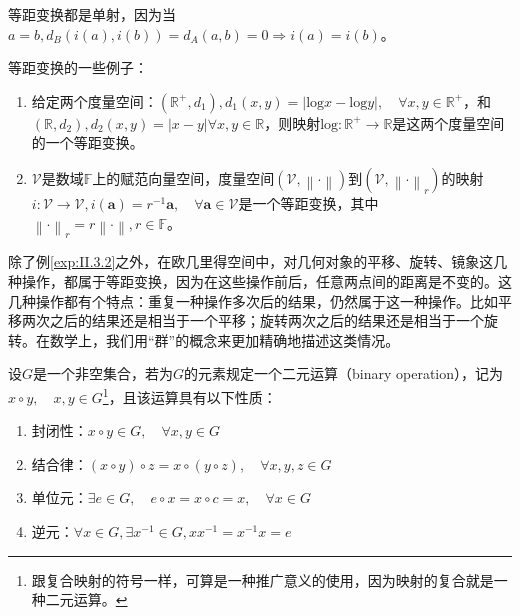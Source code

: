 \documentclass[main.tex]{subfiles}
\begin{document}
等距变换都是单射，因为当$a=b,d_B\left(i\left(a\right),i\left(b\right)\right)=d_A\left(a,b\right)=0\Rightarrow i\left(a\right)=i\left(b\right)$。

\begin{example}\label{exp:II.3.2}
    等距变换的一些例子：
    \begin{enumerate}
        \item 给定两个度量空间：$\left(\mathbb{R}^+,d_1\right),d_1\left(x,y\right)=\left|\mathrm{log}x-\mathrm{log}y\right|,\quad\forall x,y\in\mathbb{R}^+$，和$\left(\mathbb{R},d_2\right),d_2\left(x,y\right)=\left|x-y\right|\forall x,y\in\mathbb{R}$，则映射$\mathrm{log}:\mathbb{R}^+\rightarrow\mathbb{R}$是这两个度量空间的一个等距变换。
        \item $\mathcal{V}$是数域$\mathbb{F}$上的赋范向量空间，度量空间$\left(\mathcal{V},\left\|\cdot\right\|\right)$到$\left(\mathcal{V},\left\|\cdot\right\|_r\right)$的映射$i:\mathcal{V}\rightarrow\mathcal{V},i\left(\mathbf{a}\right)=r^{-1}\mathbf{a},\quad\forall\mathbf{a}\in\mathcal{V}$是一个等距变换，其中$\left\|\cdot\right\|_r=r\left\|\cdot\right\|,r\in\mathbb{F}$。
    \end{enumerate}
\end{example}

除了例\ref{exp:II.3.2}之外，在欧几里得空间中，对几何对象的平移、旋转、镜象这几种操作，都属于等距变换，因为在这些操作前后，任意两点间的距离是不变的。这几种操作都有个特点：重复一种操作多次后的结果，仍然属于这一种操作。比如平移两次之后的结果还是相当于一个平移；旋转两次之后的结果还是相当于一个旋转。在数学上，我们用“群”的概念来更加精确地描述这类情况。

\begin{definition}[群]\label{def:II.3.3}
    设$G$是一个非空集合，若为$G$的元素规定一个二元运算（binary operation），记为$x\circ y,\quad x,y\in G$\footnote{跟复合映射的符号一样，可算是一种推广意义的使用，因为映射的复合就是一种二元运算。}，且该运算具有以下性质：
    \begin{enumerate}
        \item 封闭性：$x\circ y\in G,\quad\forall x,y\in G$
        \item 结合律：$\left(x\circ y\right)\circ z=x\circ\left(y\circ z\right),\quad\forall x,y,z\in G$
        \item 单位元：$\exists e\in G,\quad e\circ x=x\circ c=x,\quad\forall x\in G$
        \item 逆元：$\forall x\in G,\exists x^{-1}\in G,xx^{-1}=x^{-1}x=e$
    \end{enumerate}
\end{definition}
\end{document}
